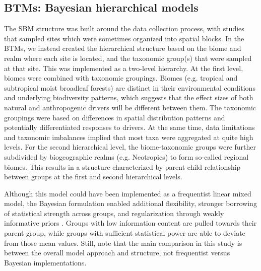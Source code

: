
\subsection*{BTMs: Bayesian hierarchical models}

The SBM structure was built around the data collection process, with studies that sampled sites which were sometimes organized into spatial blocks. In the BTMs, we instead created the hierarchical structure based on the biome and realm where each site is located, and the taxonomic group(s) that were sampled at that site. This was implemented as a two-level hierarchy. At the first level, biomes were combined with taxonomic groupings. Biomes (e.g. tropical and subtropical moist broadleaf forests) are distinct in their environmental conditions and underlying biodiversity patterns, which suggests that the effect sizes of both natural and anthropogenic drivers will be different between them. The taxonomic groupings were based on differences in spatial distribution patterns\cite{jenkins2015} and potentially differentiated responses to drivers. At the same time, data limitations and taxonomic imbalances implied that most taxa were aggregated at quite high levels. For the second hierarchical level, the biome-taxonomic groups were further subdivided by biogeographic realms (e.g. Neotropics) to form so-called regional biomes\cite{bevan2024}. This results in a structure characterized by parent-child relationship between groups at the first and second hierarchical levels.

Although this model could have been implemented as a frequentist linear mixed model, the Bayesian formulation enabled additional flexibility, stronger borrowing of statistical strength across groups, and regularization through weakly informative priors \cite{dorazio2016,gelman2012,lemoine2019}. Groups with low information content are pulled towards their parent group, while groups with sufficient statistical power are able to deviate from those mean values. Still, note that the main comparison in this study is between the overall model approach and structure, not frequentist versus Bayesian implementations.

